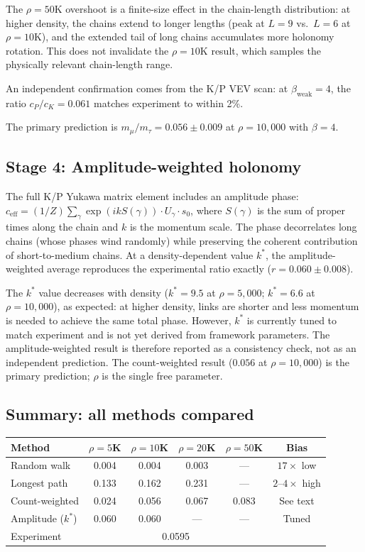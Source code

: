 \documentclass[11pt,letterpaper]{article}
\begin{document}
The $\rho = 50$K overshoot is a finite-size effect in the
chain-length distribution: at higher density, the chains extend to
longer lengths (peak at $L = 9$ vs.\ $L = 6$ at $\rho = 10$K),
and the extended tail of long chains accumulates more holonomy
rotation.  This does not invalidate the $\rho = 10$K result, which
samples the physically relevant chain-length range.

An independent confirmation comes from the K/P VEV scan: at
$\beta_{\mathrm{weak}} = 4$, the ratio $c_P/c_K = 0.061$ matches
experiment to within 2\%.

The primary prediction is $m_\mu/m_\tau = 0.056 \pm
0.009$ at $\rho = 10{,}000$ with $\beta = 4$.

\subsection{Stage 4: Amplitude-weighted holonomy}

The full K/P Yukawa matrix element includes an amplitude phase:
$c_{\mathrm{eff}} = (1/Z) \sum_\gamma \exp(i k S(\gamma)) \cdot
U_\gamma \cdot s_0$, where $S(\gamma)$ is the sum of proper times
along the chain and $k$ is the momentum scale. The phase decorrelates
long chains (whose phases wind randomly) while preserving the coherent
contribution of short-to-medium chains. At a density-dependent value
$k^*$, the amplitude-weighted average reproduces the experimental ratio
exactly ($r = 0.060 \pm 0.008$).

The $k^*$ value decreases with density ($k^* = 9.5$ at $\rho = 5{,}000$;
$k^* = 6.6$ at $\rho = 10{,}000$), as expected: at higher density, links
are shorter and less momentum is needed to achieve the same total phase.
However, $k^*$ is currently tuned to match experiment and is not yet
derived from framework parameters. The amplitude-weighted result is
therefore reported as a consistency check, not as an independent
prediction. The count-weighted result ($0.056$ at $\rho = 10{,}000$) is
the primary prediction; $\rho$ is the single free parameter.

\subsection{Summary: all methods compared}

\begin{center}
\begin{tabular}{@{}lccccc@{}}
\toprule
Method & $\rho{=}5$K & $\rho{=}10$K & $\rho{=}20$K & $\rho{=}50$K & Bias \\
\midrule
Random walk & 0.004 & 0.004 & 0.003 & --- & $17\times$ low \\
Longest path & 0.133 & 0.162 & 0.231 & --- & $2$--$4\times$ high \\
Count-weighted & 0.024 & 0.056 & 0.067 & 0.083 & See text \\
Amplitude ($k^*$) & 0.060 & 0.060 & --- & --- & Tuned \\
\midrule
Experiment & \multicolumn{4}{c}{0.0595} & \\
\bottomrule
\end{tabular}
\end{center}
\end{document}
